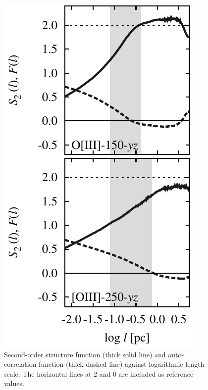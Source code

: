 \documentclass[useAMS,usenatbib]{mn2e}
\providecommand{\DIFadd}[1]{{\protect\color{red!70!black}#1}} %
\providecommand{\DIFaddFL}[1]{\DIFadd{#1}} %
\begin{document}
\begin{figure}
  \centering
  \includegraphics[width=0.8\linewidth]{auto-yz-15-25-O3}
  \caption{\DIFaddFL{Second-order structure function (thick solid line) and auto-correlation
    function (thick dashed line) against logarithmic length scale. The
    horizontal lines at 2 and 0 are included as reference values.}}
\label{fig:sfauto}
\end{figure}
\end{document}
